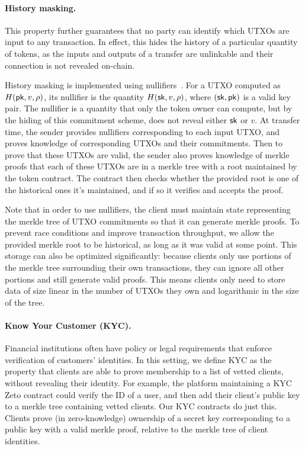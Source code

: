 
\paragraph{History masking.} This property further guarantees that no party can identify which UTXOs are input to any transaction. In effect, this hides the history of a particular quantity of tokens, as the inputs and outputs of a transfer are unlinkable and their connection is not revealed on-chain.

History masking is implemented using nullifiers~\cite{TODO}. For a UTXO computed as $H(\mathsf{pk}, v, \rho)$, its nullifier is the quantity $H(\mathsf{sk}, v, \rho)$, where $(\mathsf{sk}, \mathsf{pk})$ is a valid key pair. The nullifier is a quantity that only the token owner can compute, but by the hiding of this commitment scheme, does not reveal either $\mathsf{sk}$ or $v$. At transfer time, the sender provides nullifiers corresponding to each input UTXO, and proves knowledge of corresponding UTXOs and their commitments. Then to prove that these UTXOs are valid, the sender also proves knowledge of merkle proofs that each of these UTXOs are in a merkle tree with a root maintained by the token contract. The contract then checks whether the provided root is one of the historical ones it's maintained, and if so it verifies and accepts the proof.

Note that in order to use nullifiers, the client must maintain state representing the merkle tree of UTXO commitments so that it can generate merkle proofs. To prevent race conditions and improve transaction throughput, we allow the provided merkle root to be historical, as long as it was valid at some point. This storage can also be optimized significantly: because clients only use portions of the merkle tree surrounding their own transactions, they can ignore all other portions and still generate valid proofs. This means clients only need to store data of size linear in the number of UTXOs they own and logarithmic in the size of the tree.

\paragraph{Know Your Customer (KYC).} Financial institutions often have policy or legal requirements that enforce verification of customers' identities. In this setting, we define KYC as the property that clients are able to prove membership to a list of vetted clients, without revealing their identity. For example, the platform maintaining a KYC Zeto contract could verify the ID of a user, and then add their client's public key to a merkle tree containing vetted clients. Our KYC contracts do just this. Clients prove (in zero-knowledge) ownership of a secret key corresponding to a public key with a valid merkle proof, relative to the merkle tree of client identities.

